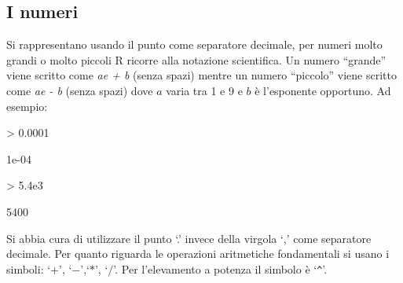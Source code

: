 \documentclass[onecolumn,11pt]{book}
\newcommand{\varia}[1]{\textsl{\textsf{#1}}}
\begin{document}
\subsection{I numeri}
Si rappresentano usando il punto come separatore decimale, per numeri molto grandi o molto piccoli \textsf{R} ricorre alla notazione scientifica. Un numero  ``grande''  viene scritto come
\varia{ae + b} (senza spazi) mentre un numero  ``piccolo'' viene scritto come
\varia{ae - b} (senza spazi) 
dove $a$ varia tra 1 e 9 e $b$  \`e l'esponente opportuno. Ad esempio:
\begin{Schunk}
\begin{Sinput}
> 0.0001
\end{Sinput}
\begin{Soutput}
[1] 1e-04
\end{Soutput}
\begin{Sinput}
> 5.4e3
\end{Sinput}
\begin{Soutput}
[1] 5400
\end{Soutput}
\end{Schunk}
Si abbia cura di utilizzare il punto `.' invece della virgola `,'  come separatore decimale.  
Per quanto riguarda le operazioni aritmetiche fondamentali si usano i simboli:
`$+$', `$-$',`$*$', `$/$'. Per l'elevamento a potenza il simbolo  \`e `\texttt{\^}'.
\end{document}
